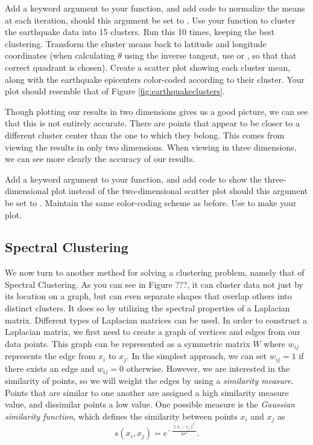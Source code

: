 \begin{problem}
Add a keyword argument  to your  function, and add code to normalize the means at each iteration, should this argument be set to .
Use your function to cluster the earthquake data into 15 clusters. Run this 10 times, keeping the best clustering.
Transform the cluster means back to latitude and longitude coordinates (when calculating $\theta$ using the inverse tangent, use  or ,
so that that correct quadrant is chosen).
Create a scatter plot showing each cluster mean, along with the earthquake epicenters color-coded according to their cluster. Your plot should resemble that of Figure \ref{fig:earthquakeclusters}.
\end{problem}

Though plotting our results in two dimensions gives us a good picture, we can see that this is not entirely accurate.  There are points that appear to be closer to a different cluster center than the one to which they belong.  This comes from viewing the results in only two dimensions.  When viewing in three dimensions, we can see more clearly the accuracy of our results.  
\begin{problem}
Add a keyword argument  to your  function, and add code to show the three-dimensional plot instead of the two-dimensional scatter plot should this argument be set to .  Maintain the same color-coding scheme as before.  Use  to make your plot.
\end{problem}


\subsection*{Spectral Clustering}
We now turn to another method for solving a clustering problem, namely that of Spectral Clustering.  As you can see in Figure ???, it can cluster data not just by its location on a graph, but can even separate shapes that overlap others into distinct clusters.  It does so by utilizing the spectral properties of a Laplacian matrix.  Different types of Laplacian matrices can be used.  In order to construct a Laplacian matrix, we first need to create a graph of vertices and edges from our data points.  This graph can be represented as a symmetric matrix $W$ where $w_{ij}$ represents the edge from $x_i$ to $x_j$.  In the simplest approach, we can set $w_{ij} = 1$ if there exists an edge and $w_{ij} = 0$ otherwise.  However, we are interested in the similarity of points, so we will weight the edges by using a \emph{similarity measure}.  Points that are similar to one another are assigned a high similarity measure value, and dissimilar points a low value.  One possible measure is the \emph{Gaussian similarity function}, which defines the similarity between points $x_i$ and $x_j$ as
\begin{equation*}
s(x_i,x_j) = e^{- \frac{\| x_i - x_j \| ^2}{2 \sigma ^2}} .
\end{equation*}

